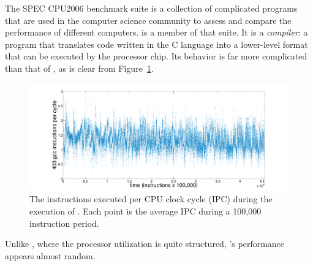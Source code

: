 The SPEC CPU2006 benchmark suite \cite{spec} is a collection of
complicated programs that are used in the computer science community
to assess and compare the performance of different computers.  \gcc is
a member of that suite.
% 
% 
It is a \emph{compiler}: a program that translates code written in the
C language into a lower-level format that can be executed by the
processor chip.  Its behavior is far more complicated than that of
\col, as is clear from Figure~\ref{fig:gcc-ts}.
  \begin{figure}[t]
  \centering
    \includegraphics[width=\columnwidth]{figs/gccfullts}
    \caption{The instructions executed per CPU clock cycle (IPC)
      during the execution of \gcc. Each point is the average IPC
      during a 100,000 instruction period.}
    \label{fig:gcc-ts}
  \end{figure}
Unlike \col, where the processor utilization is quite structured,
\gcc's performance appears almost random.

